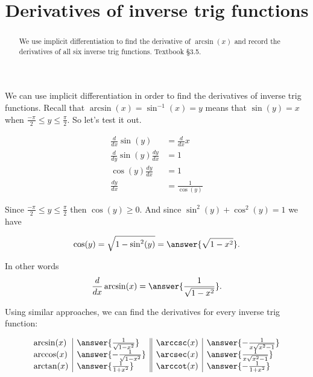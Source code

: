 \documentclass{ximera}
\title{Derivatives of inverse trig functions}
\begin{document}
\begin{abstract}
We use implicit differentiation to find the derivative of $\arcsin(x)$ and record the derivatives of all six inverse trig functions. Textbook §3.5.
\end{abstract}
\maketitle

We can use implicit differentiation in order to find the derivatives of inverse trig functions. Recall that $\arcsin (x)=\sin ^{-1}(x)=y$ means that $\sin (y)=x$ when $\frac{-\pi}{2} \leq y \leq \frac{\pi}{2}$. So let's test it out.

\[
\begin{aligned}
\frac{d}{d x} \sin (y) & =\frac{d}{d x} x \\
\frac{d}{d y} \sin (y) \frac{d y}{d x} & =1 \\
\cos (y) \frac{d y}{d x} & =1 \\
\frac{d y}{d x} & =\frac{1}{\cos (y)}
\end{aligned}
\]

Since $\frac{-\pi}{2} \leq y \leq \frac{\pi}{2}$ then $\cos (y) \geq 0$. And since $\sin ^{2}(y)+\cos ^{2}(y)=1$ we have

\[
\cos (y)=\sqrt{1-\sin ^{2}(y)}=\answer{\sqrt{1-x^{2}}}.
\]

In other words
\[
\frac{d}{dx}\arcsin(x)=\answer{\frac{1}{\sqrt{1-x^{2}}}}.
\]

Using similar approaches, we can find the derivatives for every inverse trig function:

\[
\begin{array}{l|l||l|l}
\arcsin (x) & \answer{\frac{1}{\sqrt{1-x^{2}}}} & \arccsc(x) & \answer{-\frac{1}{x \sqrt{x^{2}-1}}} \\
\arccos (x) & \answer{-\frac{1}{\sqrt{1-x^{2}}}} & \arcsec(x) & \answer{\frac{1}{x \sqrt{x^{2}-1}}} \\
\arctan (x) & \answer{\frac{1}{1+x^{2}}} & \arccot(x) & \answer{-\frac{1}{1+x^{2}}}
\end{array}
\]
\end{document}
